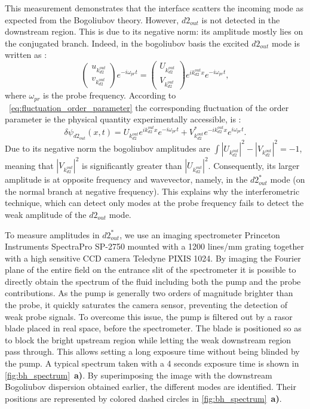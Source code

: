 This measurement demonstrates that the interface scatters the incoming mode as expected from the Bogoliubov theory. However, $d2_{out}$ is not detected in the downstream region. This is due to its negative norm: its amplitude mostly lies on the conjugated branch.
Indeed, in the bogoliubov basis the excited $d2_{out}$ mode is written as :
\begin{equation}
    \begin{pmatrix}
        u_{k_{d2}^{out}} \\
        v_{k_{d2}^{out}}
    \end{pmatrix}e^{-i\omega_{pr}t}=
    \begin{pmatrix}
    U_{k_{d2}^{out}} \\
    V_{k_{d2}^{out}}
    \end{pmatrix}e^{ik_{d2}^{out}x}e^{-i\omega_{pr}t}, 
\end{equation}
where $\omega_{pr}$ is the probe frequency. According to ~\ref{eq:fluctuation_order_parameter} the corresponding fluctuation of the order parameter ie the physical quantity experimentally accessible, is :
\begin{equation}
    \delta\psi_{{d2_{out}}}(x,t)= U_{k_{d2}^{out}}e^{ik_{d2}^{out}x}e^{-i\omega_{pr}t}+V_{k_{d2}^{out}}^*e^{-ik_{d2}^{out}x}e^{i\omega_{pr}t}.
    \label{eq:order_param_d2_out}
\end{equation}
Due to its negative norm the bogoliubov amplitudes are $\int |U_{k_{d2}^{out}}|^2-|V_{k_{d2}^{out}}|^2=-1$, meaning that  $|V_{k_{d2}^{out}}|^2$ is significantly greater than $|U_{k_{d2}^{out}}|^2$. 
Consequently, its larger amplitude is at opposite frequency and wavevector, namely, in the $d2_{out}^*$ mode (on the normal branch at negative frequency). This explains why the interferometric technique, which 
can detect only modes at the probe frequency fails to detect the weak amplitude of the $d2_{out}$ mode.

To measure amplitudes in $d2_{out}^*$, we use an imaging spectrometer Princeton Instruments SpectraPro SP-2750 mounted with a 1200 lines/mm grating together with a high sensitive CCD camera Teledyne PIXIS 1024. By imaging the Fourier plane of the entire field on the entrance slit of the spectrometer it is possible to directly obtain the spectrum of the fluid including both the pump and the probe contributions.
As the pump is generally two orders of magnitude brighter than the probe, it quickly saturates the camera sensor, preventing the detection of weak probe signals.
To overcome this issue, the pump is filtered out by a rasor blade placed in real space, before the spectrometer. The blade is positioned so as to block the bright upstream region while letting the weak downstream region pass through.
This allows setting a long exposure time without being blinded by the pump. A typical spectrum taken with a 4 seconds exposure time is shown in \autoref{fig:bh_spectrum}~\textbf{a)}. By superimposing the image with the downstream Bogoliubov dispersion obtained earlier, the different modes are identified.
Their positions are represented by colored dashed circles in \autoref{fig:bh_spectrum}~\textbf{a)}.

